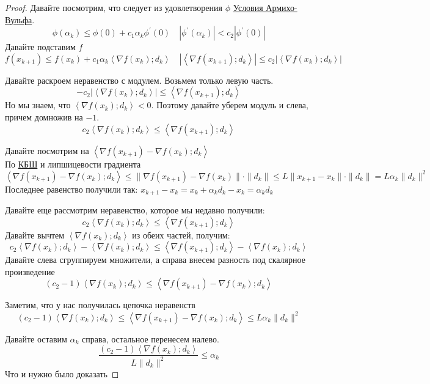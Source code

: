 \begin{proof}
  Давайте посмотрим, что следует из удовлетворения $\phi$ \hyperref[note:5330B23D-95DD-4D5D-B4A3-63EBADB1DB7D]{Условия Армихо-Вульфа}.
  \[
  \phi(\alpha_k) \le \phi(0) + c_1\alpha_k \phi^{\prime}(0)\quad |\phi^{\prime}(\alpha_k)| < c_2 |\phi^{\prime}(0)|
  \]
  Давайте подставим $f$
  \[
  f(x_{k+1}) \le f(x_k) + c_1 \alpha_k \left\langle \nabla f(x_k); d_k \right\rangle \quad | \left\langle \nabla f(x_{k+1}); d_k \right\rangle | \le c_2  |\left\langle \nabla f(x_k); d_k \right\rangle |
  \]

  Давайте раскроем неравенство с модулем. Возьмем только левую часть.
  \[
  -c_2 | \left\langle \nabla f(x_k); d_k \right\rangle| \le \left\langle \nabla f(x_{k+1}); d_k \right\rangle
  \]
  Но мы знаем, что $\left\langle \nabla f(x_k); d_k \right\rangle < 0$. Поэтому давайте уберем модуль и слева, причем домножив на $-1$.
  \[
  c_2  \left\langle \nabla f(x_k); d_k \right\rangle \le \left\langle \nabla f(x_{k+1}); d_k \right\rangle
  \]

  Давайте посмотрим на $\left\langle \nabla f(x_{k+1}) - \nabla f(x_k); d_k \right\rangle$ \\
  По \hyperref[note:D0601ACD-8C91-4A93-B0E4-AC0D529C6A5C]{КБШ} и липшицевости градиента
  \[
  \left\langle \nabla f(x_{k+1}) - \nabla f(x_k); d_k \right\rangle \le
  \| \nabla f(x_{k+1}) - \nabla f(x_k)\| \cdot \| d_k\| \le L \|x_{k+1} - x_k\| \cdot \|d_k\|
  = L \alpha_k \|d_k\|^2
  \]
  Последнее равенство получили так: $x_{k+1} - x_k = x_k + \alpha_k d_k - x_k = \alpha_kd_k$

  Давайте еще рассмотрим неравенство, которое мы недавно получили:
  \[
  c_2  \left\langle \nabla f(x_k); d_k \right\rangle \le \left\langle \nabla f(x_{k+1}); d_k \right\rangle
  \]
  Давайте вычтем $\left\langle \nabla f(x_k); d_k \right\rangle$ из обеих частей, получим:
  \[
  c_2  \left\langle \nabla f(x_k); d_k \right\rangle - \left\langle \nabla f(x_k); d_k \right\rangle  \le \left\langle \nabla f(x_{k+1}); d_k \right\rangle - \left\langle \nabla f(x_k); d_k \right\rangle
  \]
  Давайте слева сгруппируем множители, а справа внесем разность под скалярное произведение
  \[
  (c_2-1) \left\langle \nabla f(x_k);d_k \right\rangle \le \left\langle \nabla f(x_{k+1}) - \nabla f(x_k); d_k \right\rangle
  \]

  Заметим, что у нас получилась цепочка неравенств
  \[
  (c_2-1) \left\langle \nabla f(x_k);d_k \right\rangle \le \left\langle \nabla f(x_{k+1}) - \nabla f(x_k); d_k \right\rangle
  \le L\alpha_k \|d_k\|^2
  \]

  Давайте оставим $\alpha_k$ справа, остальное перенесем налево.
  \[
  \frac{(c_2-1) \left\langle \nabla f(x_k); d_k \right\rangle}{L \| d_k\|^2} \le \alpha_k
  \]
  Что и нужно было доказать
\end{proof}
